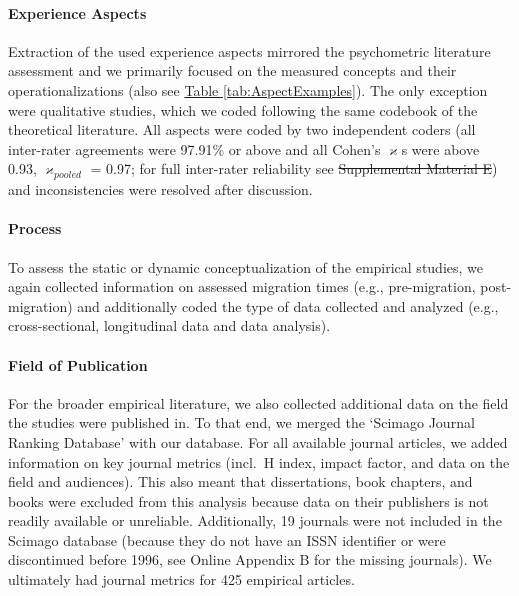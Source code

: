 \documentclass[man, 12pt, a4paper, mask]{apa7}
\newcommand{\tblref}[2][]{\hyperref[#2]{Table \ref*{#2}#1}}
\newcommand{\siannotatedanalyses}{Supplemental Material B} %
\providecommand{\DIFaddtex}[1]{{\protect\color{blue}\uwave{#1}}} %
\providecommand{\DIFdeltex}[1]{{\protect\color{red}\sout{#1}}}                      %
\providecommand{\DIFaddbegin}{} %
\providecommand{\DIFaddend}{} %
\providecommand{\DIFdelbegin}{} %
\providecommand{\DIFdelend}{} %
\providecommand{\DIFadd}[1]{\texorpdfstring{\DIFaddtex{#1}}{#1}} %
\providecommand{\DIFdel}[1]{\texorpdfstring{\DIFdeltex{#1}}{}} %
\newcommand{\DIFscaledelfig}{0.5}
\newlength{\DIFdelgraphicswidth} %
\newlength{\DIFdelgraphicsheight} %
\newcommand{\DIFaddincludegraphics}[2][]{{\color{blue}\fbox{\DIFOincludegraphics[#1]{#2}}}} %
\newcommand{\DIFdelincludegraphics}[2][]{%
\sbox{\DIFdelgraphicsbox}{\DIFOincludegraphics[#1]{#2}}%
\settoboxwidth{\DIFdelgraphicswidth}{\DIFdelgraphicsbox} %
\settoboxtotalheight{\DIFdelgraphicsheight}{\DIFdelgraphicsbox} %
\scalebox{\DIFscaledelfig}{%
\parbox[b]{\DIFdelgraphicswidth}{\usebox{\DIFdelgraphicsbox}\\[-\baselineskip] \rule{\DIFdelgraphicswidth}{0em}}\llap{\resizebox{\DIFdelgraphicswidth}{\DIFdelgraphicsheight}{%
\setlength{\unitlength}{\DIFdelgraphicswidth}%
\begin{picture}(1,1)%
\thicklines\linethickness{2pt} %
{\color[rgb]{1,0,0}\put(0,0){\framebox(1,1){}}}%
{\color[rgb]{1,0,0}\put(0,0){\line( 1,1){1}}}%
{\color[rgb]{1,0,0}\put(0,1){\line(1,-1){1}}}%
\end{picture}%
}\hspace*{3pt}}} %
} %
\DeclareRobustCommand{\DIFaddbegin}{\DIFOaddbegin \let\includegraphics\DIFaddincludegraphics} %
\DeclareRobustCommand{\DIFaddend}{\DIFOaddend \let\includegraphics\DIFOincludegraphics} %
\DeclareRobustCommand{\DIFdelbegin}{\DIFOdelbegin \let\includegraphics\DIFdelincludegraphics} %
\DeclareRobustCommand{\DIFdelend}{\DIFOaddend \let\includegraphics\DIFOincludegraphics} %
\begin{document}
\paragraph{Experience Aspects}

Extraction of the used experience aspects mirrored the psychometric
literature assessment and we primarily focused on the measured concepts
and their operationalizations (also see \tblref{tab:AspectExamples}).
The only exception were qualitative studies, which we coded following
the same codebook of the theoretical literature. All aspects were coded
by two independent coders (all inter-rater agreements were 97.91\% or
above and all Cohen's \(\varkappa\)s were above 0.93,
\(\varkappa_{pooled}\) = 0.97; for full inter-rater reliability see
\DIFdelbegin \DIFdel{Supplemental Material E}\DIFdelend \DIFaddbegin \DIFadd{\siannotatedanalyses}\DIFaddend ) and inconsistencies were resolved after
discussion.

\paragraph{Process}

To assess the static or dynamic conceptualization of the empirical
studies, we again collected information on assessed migration times
(e.g., pre-migration, post-migration) and additionally coded the type of
data collected and analyzed (e.g., cross-sectional, longitudinal data
and data analysis).

\paragraph{Field of Publication}

For the broader empirical literature, we also collected additional data
on the field the studies were published in. To that end, we merged the
`Scimago Journal Ranking Database' \citep{SCImago2020} with our
database. For all available journal articles, we added information on
key journal metrics (incl.~H index, impact factor, and data on the field
and audiences). This also meant that dissertations, book chapters, and
books were excluded from this analysis because data on their publishers
is not readily available or unreliable. Additionally, 19 journals were
not included in the Scimago database (because they do not have an ISSN
identifier or were discontinued before 1996, see Online Appendix B for
the missing journals). We ultimately had journal metrics for 425
empirical articles.
\end{document}
